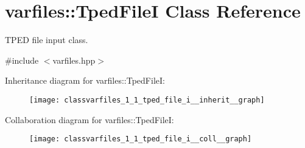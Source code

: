 \hypertarget{classvarfiles_1_1_tped_file_i}{}\section{varfiles\+:\+:Tped\+FileI Class Reference}
\label{classvarfiles_1_1_tped_file_i}


T\+P\+ED file input class.  




{\ttfamily \#include $<$varfiles.\+hpp$>$}



Inheritance diagram for varfiles\+:\+:Tped\+FileI\+:\nopagebreak
\begin{figure}[H]
\begin{center}
\leavevmode
\texttt{[image: classvarfiles\_1\_1\_tped\_file\_i\_\_inherit\_\_graph]}
\end{center}
\end{figure}


Collaboration diagram for varfiles\+:\+:Tped\+FileI\+:\nopagebreak
\begin{figure}[H]
\begin{center}
\leavevmode
\texttt{[image: classvarfiles\_1\_1\_tped\_file\_i\_\_coll\_\_graph]}
\end{center}
\end{figure}
